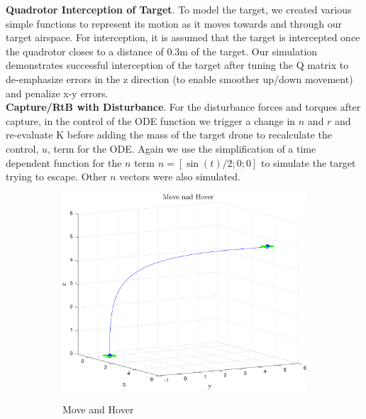 \documentclass{article}
\begin{document}
\begin{multicols}{2}
\textbf{Quadrotor Interception of Target}. To model the target, we created various simple functions to represent its motion as it moves towards and through our target airspace. For interception, it is assumed that the target is intercepted once the quadrotor closes to a distance of 0.3m of the target. Our simulation demonstrates successful interception of the target after tuning the Q matrix to de-emphasize errors in the z direction (to enable smoother up/down 
movement) and penalize x-y errors.  \\
\textbf{Capture/RtB with Disturbance}.  For the disturbance forces and torques after capture,  in the control of the ODE function we trigger a change in $n$ and $r$ and re-evaluate K before adding the mass of the target drone to recalculate the control, $u$, term for the ODE.  Again we use the simplification of a time dependent function for the $n$ term $n=[\sin(t)/2; 0; 0]$ to simulate the target trying to escape.  Other $n$ vectors were also simulated.\\
\begin{figure}[H]
\centering
\begin{subfigure}[b]{0.45\columnwidth}
    \centering
    \includegraphics[width = 1\textwidth]{images/MoveAndHover.png}
     \label{fig:MandH}
     \vspace{-5mm}
     \caption{Move and Hover}
\end{subfigure}
\begin{subfigure}[b]{0.45\columnwidth}
    \centering

\end{subfigure}
\end{figure}
\end{multicols}
\end{document}
